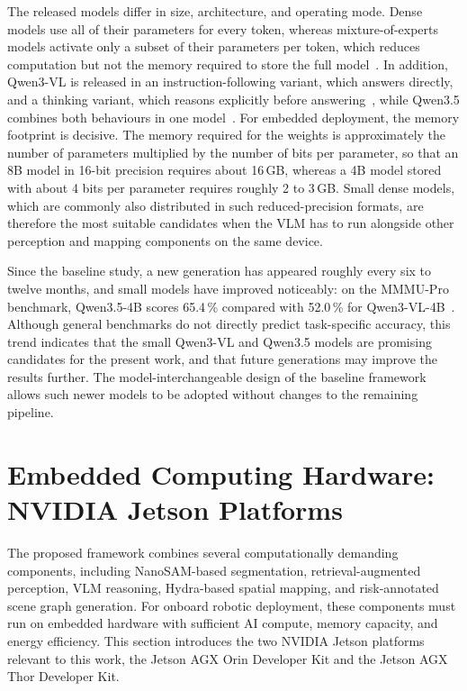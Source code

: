 {{{The released models differ in size, architecture, and operating mode. Dense models use all of their parameters for every token, whereas mixture-of-experts models activate only a subset of their parameters per token, which reduces computation but not the memory required to store the full model~\cite{bai2025qwen3vl}. In addition, Qwen3-VL is released in an instruction-following variant, which answers directly, and a thinking variant, which reasons explicitly before answering~\cite{bai2025qwen3vl}, while Qwen3.5 combines both behaviours in one model~\cite{qwen2026qwen35}. For embedded deployment, the memory footprint is decisive. The memory required for the weights is approximately the number of parameters multiplied by the number of bits per parameter, so that an 8B model in 16-bit precision requires about 16\,GB, whereas a 4B model stored with about 4 bits per parameter requires roughly 2 to 3\,GB. Small dense models, which are commonly also distributed in such reduced-precision formats, are therefore the most suitable candidates when the VLM has to run alongside other perception and mapping components on the same device.

Since the baseline study, a new generation has appeared roughly every six to twelve months, and small models have improved noticeably: on the MMMU-Pro benchmark, Qwen3.5-4B scores 65.4\,\% compared with 52.0\,\% for Qwen3-VL-4B~\cite{artificialanalysis2026qwen35}. Although general benchmarks do not directly predict task-specific accuracy, this trend indicates that the small Qwen3-VL and Qwen3.5 models are promising candidates for the present work, and that future generations may improve the results further. The model-interchangeable design of the baseline framework allows such newer models to be adopted without changes to the remaining pipeline.

}






\iffalse
\section{Embedded Computing Hardware: NVIDIA Jetson Platforms}

{\small

The proposed framework combines several computationally demanding components, including NanoSAM-based segmentation, retrieval-augmented perception, VLM reasoning, Hydra-based spatial mapping, and risk-annotated scene graph generation. For onboard robotic deployment, these components must run on embedded hardware with sufficient AI compute, memory capacity, and energy efficiency. This section introduces the two NVIDIA Jetson platforms relevant to this work, the Jetson AGX Orin Developer Kit and the Jetson AGX Thor Developer Kit.

}}}
